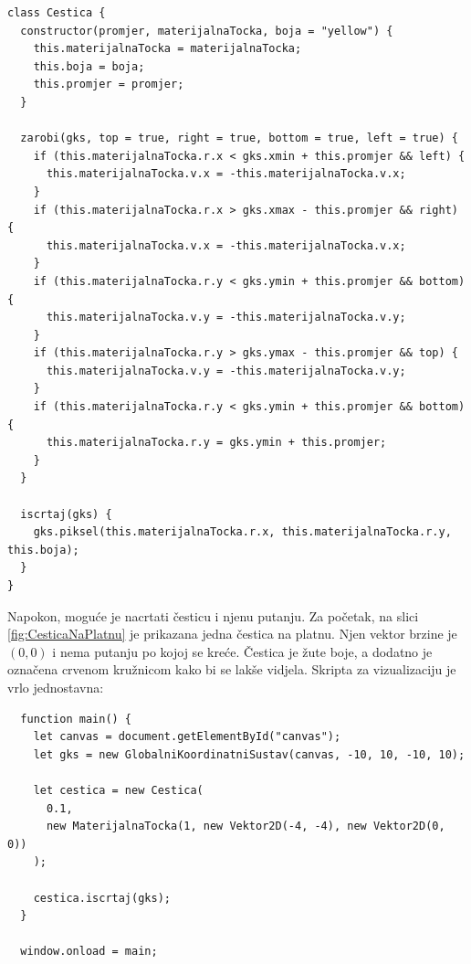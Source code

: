 \documentclass{foi}
\begin{document}
\begin{verbatim}
class Cestica {
  constructor(promjer, materijalnaTocka, boja = "yellow") {
    this.materijalnaTocka = materijalnaTocka;
    this.boja = boja;
    this.promjer = promjer;
  }

  zarobi(gks, top = true, right = true, bottom = true, left = true) {
    if (this.materijalnaTocka.r.x < gks.xmin + this.promjer && left) {
      this.materijalnaTocka.v.x = -this.materijalnaTocka.v.x;
    }
    if (this.materijalnaTocka.r.x > gks.xmax - this.promjer && right) {
      this.materijalnaTocka.v.x = -this.materijalnaTocka.v.x;
    }
    if (this.materijalnaTocka.r.y < gks.ymin + this.promjer && bottom) {
      this.materijalnaTocka.v.y = -this.materijalnaTocka.v.y;
    }
    if (this.materijalnaTocka.r.y > gks.ymax - this.promjer && top) {
      this.materijalnaTocka.v.y = -this.materijalnaTocka.v.y;
    }
    if (this.materijalnaTocka.r.y < gks.ymin + this.promjer && bottom) {
      this.materijalnaTocka.r.y = gks.ymin + this.promjer;
    }
  }

  iscrtaj(gks) {
    gks.piksel(this.materijalnaTocka.r.x, this.materijalnaTocka.r.y, this.boja);
  }
}
\end{verbatim}
Napokon, moguće je nacrtati česticu i njenu putanju. Za početak, na slici \ref{fig:CesticaNaPlatnu} je prikazana jedna čestica na platnu. Njen vektor brzine je $(0, 0)$ i nema putanju po kojoj se kreće. Čestica je žute boje, a dodatno je označena crvenom kružnicom kako bi se lakše vidjela. Skripta za vizualizaciju je vrlo jednostavna:

\begin{verbatim}
  function main() {
    let canvas = document.getElementById("canvas");
    let gks = new GlobalniKoordinatniSustav(canvas, -10, 10, -10, 10);

    let cestica = new Cestica(
      0.1,
      new MaterijalnaTocka(1, new Vektor2D(-4, -4), new Vektor2D(0, 0))
    );

    cestica.iscrtaj(gks);
  }

  window.onload = main;
\end{verbatim}
\end{document}

